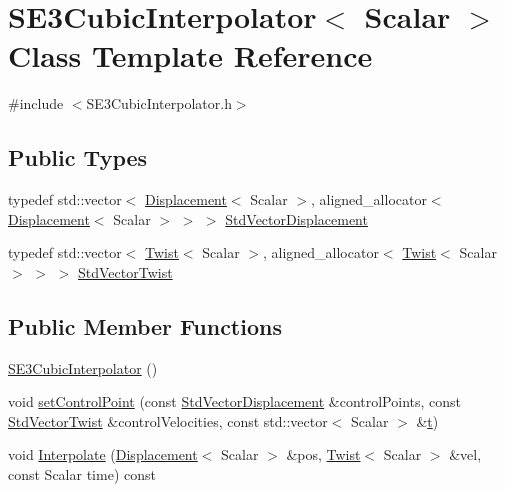 \hypertarget{class_s_e3_cubic_interpolator}{}\section{S\+E3\+Cubic\+Interpolator$<$ Scalar $>$ Class Template Reference}
\label{class_s_e3_cubic_interpolator}


{\ttfamily \#include $<$S\+E3\+Cubic\+Interpolator.\+h$>$}

\subsection*{Public Types}
\begin{DoxyCompactItemize}
\item 
typedef std\+::vector$<$ \hyperlink{class_displacement}{Displacement}$<$ Scalar $>$, aligned\+\_\+allocator$<$ \hyperlink{class_displacement}{Displacement}$<$ Scalar $>$ $>$ $>$ \hyperlink{class_s_e3_cubic_interpolator_ad6c935ddaa217d370411c200321dc089}{Std\+Vector\+Displacement}
\item 
typedef std\+::vector$<$ \hyperlink{class_twist}{Twist}$<$ Scalar $>$, aligned\+\_\+allocator$<$ \hyperlink{class_twist}{Twist}$<$ Scalar $>$ $>$ $>$ \hyperlink{class_s_e3_cubic_interpolator_ae70acde9b57ec38aaf1eaeee50bb35c5}{Std\+Vector\+Twist}
\end{DoxyCompactItemize}
\subsection*{Public Member Functions}
\begin{DoxyCompactItemize}
\item 
\hyperlink{class_s_e3_cubic_interpolator_a17856cd852a2260ea88169617997b02e}{S\+E3\+Cubic\+Interpolator} ()
\item 
void \hyperlink{class_s_e3_cubic_interpolator_aa070ccd623a41b2eb12b6513aab14021}{set\+Control\+Point} (const \hyperlink{class_s_e3_cubic_interpolator_ad6c935ddaa217d370411c200321dc089}{Std\+Vector\+Displacement} \&control\+Points, const \hyperlink{class_s_e3_cubic_interpolator_ae70acde9b57ec38aaf1eaeee50bb35c5}{Std\+Vector\+Twist} \&control\+Velocities, const std\+::vector$<$ Scalar $>$ \&\hyperlink{class_s_e3_cubic_interpolator_ad8083c34a619f3cb55f35ccaffeb6154}{t})
\item 
void \hyperlink{class_s_e3_cubic_interpolator_aebb1a7f9c3123cd3df8cec6d9dc5a72a}{Interpolate} (\hyperlink{class_displacement}{Displacement}$<$ Scalar $>$ \&pos, \hyperlink{class_twist}{Twist}$<$ Scalar $>$ \&vel, const Scalar time) const
\end{DoxyCompactItemize}

